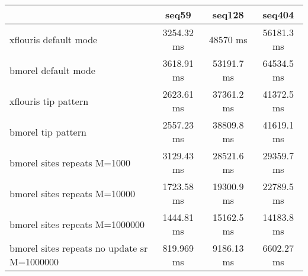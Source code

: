 \begin{tabular}{|l|c|c|c|}
\hline
 & seq59 & seq128 & seq404  \\
\hline
xflouris default mode & 3254.32 ms & 48570 ms & 56181.3 ms\\
\hline
bmorel default mode & 3618.91 ms & 53191.7 ms & 64534.5 ms\\
\hline
xflouris tip pattern & 2623.61 ms & 37361.2 ms & 41372.5 ms\\
\hline
bmorel tip pattern & 2557.23 ms & 38809.8 ms & 41619.1 ms\\
\hline
bmorel sites repeats M=1000 & 3129.43 ms & 28521.6 ms & 29359.7 ms\\
\hline
bmorel sites repeats M=10000 & 1723.58 ms & 19300.9 ms & 22789.5 ms\\
\hline
bmorel sites repeats M=1000000 & 1444.81 ms & 15162.5 ms & 14183.8 ms\\
\hline
bmorel sites repeats no update sr  M=1000000 & 819.969 ms & 9186.13 ms & 6602.27 ms\\
\hline
\end{tabular}
